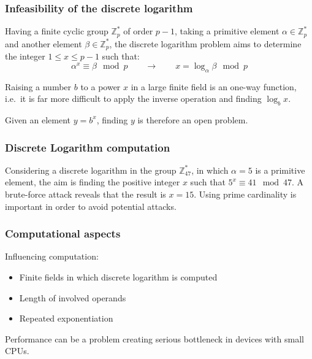 \documentclass{beamer}
\begin{document}

\begin{frame}
\frametitle{Infeasibility of the discrete logarithm}
Having a finite cyclic group $\mathbb{Z}^*_p$ of order $p - 1$, taking a primitive element $\alpha \in\mathbb{Z}^*_p$ and another element $\beta \in \mathbb{Z}^*_p$, the discrete logarithm problem aims to determine the integer $1 \leq x \leq p - 1$ such that:
$$\alpha^x \equiv \beta \mod p \qquad \rightarrow \qquad x = \log_\alpha\beta \mod p$$

Raising a number $b$ to a power $x$ in a large finite field is an one-way function, i.e.\ it is far more difficult to apply the inverse operation and finding $\log_bx$. 

Given an element $y = b^x$, finding $y$ is therefore an open problem.
\end{frame}


\begin{frame}
\frametitle{Discrete Logarithm computation}

\begin{example}
Considering a discrete logarithm in the group $\mathbb{Z}^*_{47}$, in which $\alpha = 5$ is a primitive element, the aim is finding the positive integer $x$ such that $5^x \equiv 41 \mod 47$.
\vspace{0.3cm}
A brute-force attack reveals that the result is $x = 15$.
Using prime cardinality is important in order to avoid potential attacks.
\end{example}

\end{frame}


\begin{frame}
\frametitle{Computational aspects}
Influencing computation:
\begin{itemize}
    \item Finite fields in which discrete logarithm is computed
    \item Length of involved operands
    \item Repeated exponentiation
\end{itemize}
Performance can be a problem creating serious bottleneck in devices with small CPUs.
\end{frame}

\end{document}
